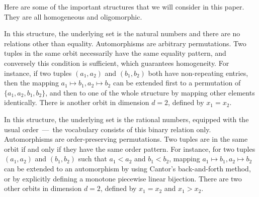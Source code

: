 Here are some of the important structures that we will consider in this paper.
They are all homogeneous and oligomorphic.
\begin{example} \label{ex:equality-atoms} 
    In this structure, the underlying set is the natural numbers and there are no relations other than equality. 
    Automorphisms are arbitrary permutations. 
    Two tuples in the same orbit necessarily have the same equality pattern,
    and conversely this condition is sufficient, which guarantees homogeneity.
    For instance, if two tuples $(a_1, a_2)$ and $(b_1, b_2)$ both have non-repeating entries, then the mapping $a_1 \mapsto b_1, a_2 \mapsto b_2$ can be extended first to a permutation of $\{a_1, a_2, b_1, b_2\}$, and then to one of the whole structure by mapping other elements identically.
    There is another orbit in dimension $d = 2$, defined by $x_1 = x_2$.
\lipicsEnd\end{example}

\begin{example} \label{ex:order-atoms} 
    In this structure, the underlying set is the rational numbers, 
    equipped with the usual order~---~the vocabulary consists of this binary relation only.
    Automorphisms are order-preserving permutations. 
    Two tuples are in the same orbit if and only if they have the same order pattern. 
    For instance, for two tuples $(a_1, a_2)$ and $(b_1, b_2)$ such that $a_1<a_2$ and $b_1<b_2$, mapping $a_1 \mapsto b_1, a_2 \mapsto b_2$ can be extended to an automorphism by using Cantor's back-and-forth method, or by explicitly defining a monotone piecewise linear bijection.
    There are two other orbits in dimension $d = 2$, defined by $x_1 = x_2$ and $x_1 > x_2$.
\lipicsEnd\end{example}

